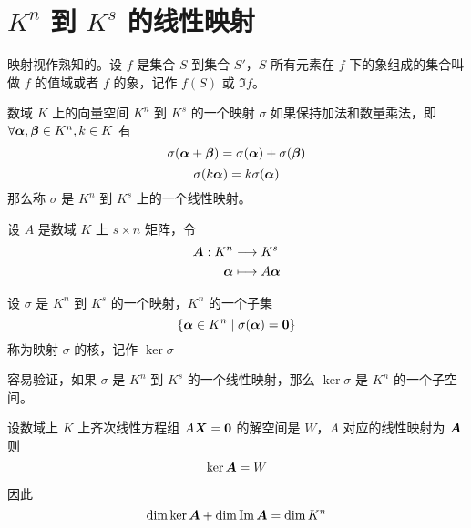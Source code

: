 \section{\texorpdfstring{$K^n$ 到 $K^s$ 的线性映射}{Kn 到 Ks 的线性映射}}

映射视作熟知的。设 $f$ 是集合 $S$ 到集合 $S'$，$S$ 所有元素在 $f$ 下的象组成的集合叫做 $f$ 的值域或者 $f$ 的象，记作 $f(S)$ 或 $\Im f$。

\begin{definition}
    数域 $K$ 上的向量空间 $K^n$ 到 $K^s$ 的一个映射 $\sigma$ 如果保持加法和数量乘法，即 $\forall \boldsymbol{\alpha},\boldsymbol{\beta} \in K^n,k\in K$ 有
    $$\sigma (\boldsymbol{\alpha}+\boldsymbol{\beta}) = \sigma(\boldsymbol{\alpha}) + \sigma(\boldsymbol{\beta})$$
    $$\sigma(k\boldsymbol{\alpha}) = k\sigma(\boldsymbol{\alpha})$$
    那么称 $\sigma$ 是 $K^n$ 到 $K^s$ 上的一个线性映射。
\end{definition}

设 $A$ 是数域 $K$ 上 $s\times n$ 矩阵，令
\begin{equation*}
    \begin{aligned}
        \boldsymbol{A} : K^n &\longrightarrow K^s\\
        \boldsymbol{\alpha} &\longmapsto A\boldsymbol{\alpha}
    \end{aligned}
\end{equation*}


\begin{definition}
    设 $\sigma$ 是 $K^n$ 到 $K^s$ 的一个映射，$K^n$ 的一个子集
    $$\{\boldsymbol{\alpha} \in K^n \mid \sigma(\boldsymbol{\alpha}) = \boldsymbol{0}\}$$
    称为映射 $\sigma$ 的核，记作 $\ker \sigma$
\end{definition}

容易验证，如果 $\sigma$ 是 $K^n$ 到 $K^s$ 的一个线性映射，那么 $\ker \sigma$ 是 $K^n$ 的一个子空间。

\begin{theorem}
    设数域上 $K$ 上齐次线性方程组 $A\boldsymbol{X} = \boldsymbol{0}$ 的解空间是 $W$，$A$ 对应的线性映射为 $\boldsymbol{A}$ 则
    $$\ker \boldsymbol{A} = W$$
\end{theorem}

因此
$$\dim \ker \boldsymbol{A} + \dim \operatorname{Im} \boldsymbol{A} = \dim K^n$$
